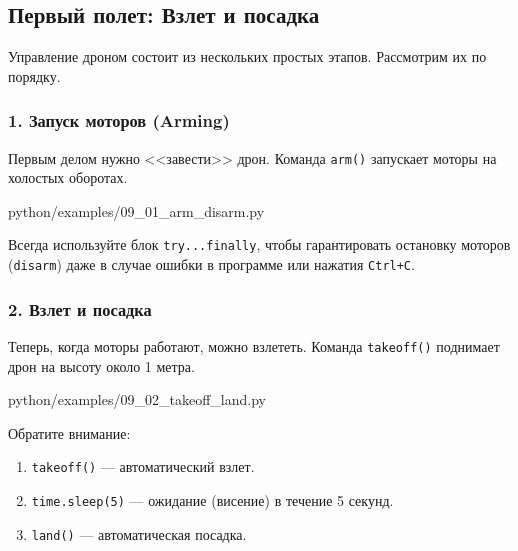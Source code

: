 \subsection{Первый полет: Взлет и посадка}

Управление дроном состоит из нескольких простых этапов. Рассмотрим их по порядку.

\subsubsection*{1. Запуск моторов (Arming)}
Первым делом нужно <<завести>> дрон. Команда \texttt{arm()} запускает моторы на холостых оборотах.

\begin{codefile}[python]{python/examples/09_01_arm_disarm.py}
\end{codefile}

\begin{warnbox}[Безопасность]
Всегда используйте блок \texttt{try...finally}, чтобы гарантировать остановку моторов (\texttt{disarm}) даже в случае ошибки в программе или нажатия \texttt{Ctrl+C}.
\end{warnbox}

\subsubsection*{2. Взлет и посадка}
Теперь, когда моторы работают, можно взлететь. Команда \texttt{takeoff()} поднимает дрон на высоту около 1 метра.

\begin{codefile}[python]{python/examples/09_02_takeoff_land.py}
\end{codefile}

Обратите внимание:
\begin{enumerate}
    \item \texttt{takeoff()} — автоматический взлет.
    \item \texttt{time.sleep(5)} — ожидание (висение) в течение 5 секунд.
    \item \texttt{land()} — автоматическая посадка.
\end{enumerate}
